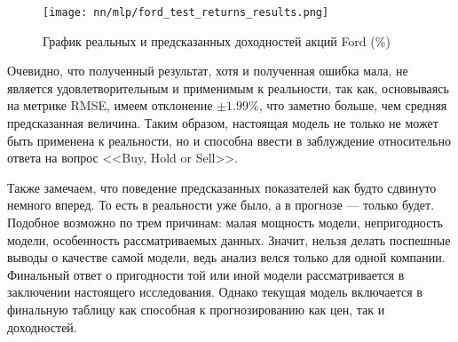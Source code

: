 \begin{figure}[H]
	\centering
	\texttt{[image: nn/mlp/ford\_test\_returns\_results.png]}
	\caption{График реальных и предсказанных доходностей акций Ford (\%)}
	\label{fig::ford_test_returns_results}
\end{figure}
Очевидно, что полученный результат, хотя и полученная ошибка мала, не является удовлетворительным и применимым к реальности, так как, основываясь на метрике RMSE, имеем отклонение $\pm 1.99\%$, что заметно больше, чем средняя предсказанная величина. Таким образом, настоящая модель не только не может быть применена к реальности, но и способна ввести в заблуждение относительно ответа на вопрос <<Buy, Hold or Sell>>.

Также замечаем, что поведение предсказанных показателей как будто сдвинуто немного вперед. То есть в реальности уже было, а в прогнозе --- только будет. Подобное возможно по трем причинам: малая мощность модели, непригодность модели, особенность рассматриваемых данных. Значит, нельзя делать поспешные выводы о качестве самой модели, ведь анализ велся только для одной компании. Финальный ответ о пригодности той или иной модели рассматривается в заключении настоящего исследования. Однако текущая модель включается в финальную таблицу как способная к прогнозированию как цен, так и доходностей.